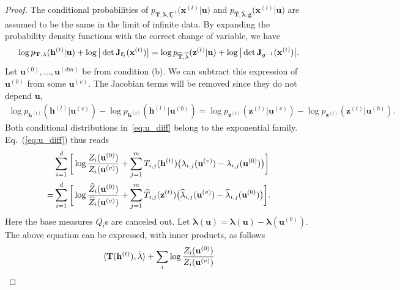 \documentclass{article}
\begin{document}
\begin{proof}
The conditional probabilities of $p_{\mathbf{T}, \mathbf{\lambda}, \mathbf{f}_t^{-1} }\big(\mathbf{x}^{(t)} | \mathbf{u}\big)$ and $p_{\widehat{\mathbf{T}}, \widehat{\mathbf{\lambda}}, \mathbf{g} }\big(\mathbf{x}^{(t)} | \mathbf{u}\big)$ are assumed to be the same in the limit of infinite data.  
By expanding the probability density functions with the correct change of variable, we have 
\begin{align} \notag
\log p_{\mathbf{T}, \mathbf{\lambda}}(\mathbf{h}^{(t)}| \mathbf{u}) + \log \big| \det \mathbf{J}_{\mathbf{f}_t}(\mathbf{x}^{(t)}) \big| = \log p_{\widehat{\mathbf{T}}, \widehat{\mathbf{\lambda}}}(\mathbf{z}^{(t)}| \mathbf{u}) + \log \big| \det \mathbf{J}_{g^{-1}}(\mathbf{x}^{(t)}) \big|.
\end{align}
Let $\mathbf{u}^{(0)},...,\mathbf{u}^{(dm)}$ be from condition (b). We can subtract this expression of $\mathbf{u}^{(0)}$ from some  $\mathbf{u}^{(v)}$. The Jacobian terms will be removed since they do not depend  $\mathbf{u}$,
\begin{align} \label{eq:u_diff}
\log p_{\mathbf{h}^{(t)}}(\mathbf{h}^{(t)}|\mathbf{u}^{(v)}) - \log p_{\mathbf{h}^{(t)}}(\mathbf{h}^{(t)}|\mathbf{u}^{(0)}) =\log p_{\mathbf{z}^{(t)}}(\mathbf{z}^{(t)}|\mathbf{u}^{(v)}) - \log p_{\mathbf{z}^{(t)}}(\mathbf{z}^{(t)}|\mathbf{u}^{(0)}) .
\end{align}
Both conditional distributions in~\eqref{eq:u_diff} belong to the exponential family. 
Eq.~(\ref{eq:u_diff}) thus reads
\begin{align} \notag
&\sum_{i=1}^d \bigg[\log \frac{Z_i(\mathbf{u}^{(0)})}{Z_i(\mathbf{u}^{(v)})} + \sum_{j=1}^m T_{i,j}(\mathbf{h}^{(t)})\big(\lambda_{i,j}(\mathbf{u}^{(v)})- \lambda_{i,j}(\mathbf{u}^{(0)})\big) \bigg] \\ \notag
= & \sum_{i=1}^d \bigg[\log \frac{\widehat{Z}_i(\mathbf{u}^{(0)})}{\widehat{Z}_i(\mathbf{u}^{(v)})} + \sum_{j=1}^m \widehat{T}_{i,j}(\mathbf{z}^{(t)})\big(\widehat{\lambda}_{i,j}(\mathbf{u}^{(v)})- \widehat{\lambda}_{i,j}(\mathbf{u}^{(0)})\big) \bigg].
\end{align}
Here the base measures $Q_i$s are canceled out. 
Let $\bar{\mathbf{\lambda}}(\mathbf{u}) = \mathbf{\lambda}(\mathbf{u})-\mathbf{\lambda}(\mathbf{u}^{(0)})$. 
The above equation can be expressed, with inner products, as follows
\begin{align} \notag
\langle \mathbf{T}(\mathbf{h}^{(t)}), \bar{\mathbf{\lambda}}	\rangle + \sum_i \log \frac{Z_i(\mathbf{u}^{(0)})}{Z_i(\mathbf{u}^{(v)})}

\end{align}
\end{proof}
\end{document}
